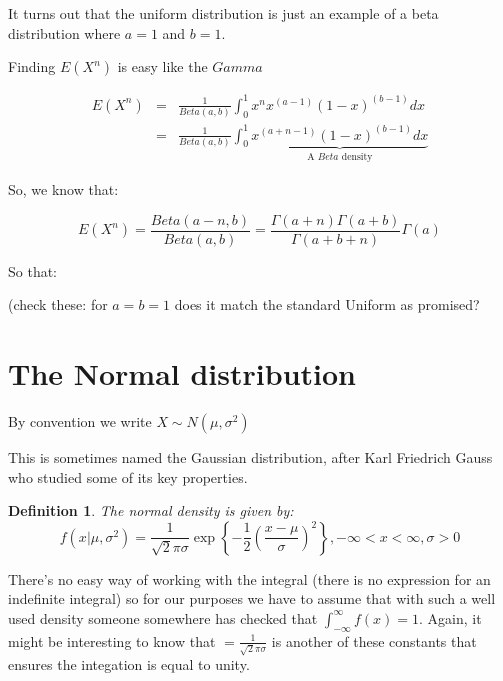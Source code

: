\documentclass[12pt]{extbook}
\newtheorem{df}{Definition}[section]
\begin{document}
It turns out that the uniform distribution is just an example of a beta distribution where $a=1$ and $b=1$.




Finding $E(X^n)$ is easy like the $Gamma$

\begin{eqnarray*}
E(X^n) &=& \frac{1}{Beta(a,b)} \int_{0}^1 x^n x^{(a-1)}(1-x)^{(b-1)}dx \\
&=&  \frac{1}{Beta(a,b)} \int_{0}^1 \underbrace{x^{(a+n-1)}(1-x)^{(b-1)}dx}_{\mbox{A } Beta \mbox{ density}} 
\end{eqnarray*}

So, we know that:

\begin{displaymath}
E(X^n) = \frac{Beta(a-n, b)}{Beta(a,b)} = \frac{\Gamma(a+n) \Gamma(a+b)}{\Gamma(a+b+n)}{\Gamma(a)}
\end{displaymath}

So that:




(check these: for $a=b=1$ does it match the standard Uniform as promised?




\section{The Normal distribution}

{\color{green}By convention we write $X \sim N(\mu, \sigma^2)$}

This is sometimes named the Gaussian distribution, after Karl Friedrich Gauss who studied some of its key properties.

\begin{df}
The normal density is given by:
\begin{displaymath}
f(x|\mu, \sigma^2)=\frac{1}{\sqrt 2 \pi \sigma} \exp \left\{ -\frac{1}{2} \left(\frac{x-\mu}{\sigma} \right)^2 \right\}, -\infty < x < \infty, \sigma > 0 
\end{displaymath}
\end{df}

There's no easy way of working with the integral (there is no expression for an indefinite integral) so for our purposes we have to assume that with such a well used density someone somewhere has checked that $\int_{-\infty}^{\infty}f(x)=1$.  Again, it might be interesting to know that $=\frac{1}{\sqrt 2 \pi \sigma}$ is another of these constants that ensures the integation is equal to unity.
\end{document}
